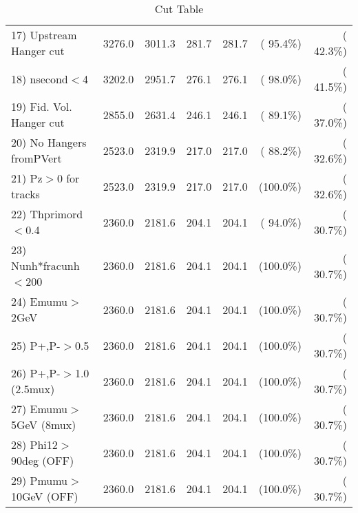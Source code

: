 \begin{table}[h!]
\begin{tabular}{||l||r|r|r|r|r|r||}
 17) Upstream Hanger cut  &       3276.0 &       3011.3 &        281.7 &        281.7 & ( 95.4\%) & ( 42.3\%) \\
 18) nsecond$<$4          &       3202.0 &       2951.7 &        276.1 &        276.1 & ( 98.0\%) & ( 41.5\%) \\
 19) Fid. Vol. Hanger cut &       2855.0 &       2631.4 &        246.1 &        246.1 & ( 89.1\%) & ( 37.0\%) \\
 20) No Hangers fromPVert &       2523.0 &       2319.9 &        217.0 &        217.0 & ( 88.2\%) & ( 32.6\%) \\
 21) Pz$>$0 for tracks    &       2523.0 &       2319.9 &        217.0 &        217.0 & (100.0\%) & ( 32.6\%) \\
 22) Thprimord$<$0.4      &       2360.0 &       2181.6 &        204.1 &        204.1 & ( 94.0\%) & ( 30.7\%) \\
 23) Nunh*fracunh$<$200   &       2360.0 &       2181.6 &        204.1 &        204.1 & (100.0\%) & ( 30.7\%) \\
 24) Emumu$>$2GeV         &       2360.0 &       2181.6 &        204.1 &        204.1 & (100.0\%) & ( 30.7\%) \\
 25) P+,P-$>$0.5          &       2360.0 &       2181.6 &        204.1 &        204.1 & (100.0\%) & ( 30.7\%) \\
 26) P+,P-$>$1.0 (2.5mux) &       2360.0 &       2181.6 &        204.1 &        204.1 & (100.0\%) & ( 30.7\%) \\
 27) Emumu$>$5GeV  (8mux) &       2360.0 &       2181.6 &        204.1 &        204.1 & (100.0\%) & ( 30.7\%) \\
 28) Phi12$>$90deg  (OFF) &       2360.0 &       2181.6 &        204.1 &        204.1 & (100.0\%) & ( 30.7\%) \\
 29) Pmumu$>$10GeV  (OFF) &       2360.0 &       2181.6 &        204.1 &        204.1 & (100.0\%) & ( 30.7\%) \\
 \hline
 \hline
 \end{tabular}
 \caption{Cut Table           }
 \label{tab-cutcohjpsi-mumu_anumucc}
 \end{table}
